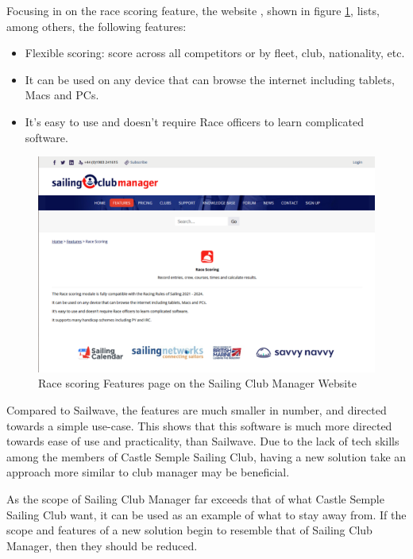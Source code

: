 \documentclass{l4proj}
\begin{document}
Focusing in on the race scoring feature, the website \citep{ClubManager}, shown in figure \ref{fig:ClubManager},  lists, among others, the following features:

\begin{itemize}
    \item
    Flexible scoring: score across all competitors or by fleet, club, nationality, etc.
    \item
    It can be used on any device that can browse the internet including tablets, Macs and PCs. 
    \item
    It's easy to use and doesn't require Race officers to learn complicated software. 
\end{itemize}

\begin{figure}[H]
    \centering
    \includegraphics[width=1\linewidth]{images/ClubManager.png} 

    \caption{Race scoring Features page on the Sailing Club Manager Website \citep{ClubManager}
    }

    \label{fig:ClubManager}
\end{figure}
Compared to Sailwave, the features are much smaller in number, and directed towards a simple use-case. This shows that this software is much more directed towards ease of use and practicality, than Sailwave. Due to the lack of tech skills among the members of Castle Semple Sailing Club, having a new solution take an approach more similar to club manager may be beneficial.

As the scope of Sailing Club Manager far exceeds that of what Castle Semple Sailing Club want, it can be used as an example of what to stay away from. If the scope and features of a new solution begin to resemble that of Sailing Club Manager, then they should be reduced.
\end{document}
